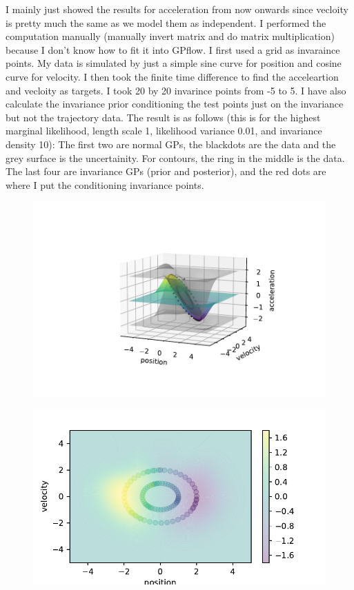 \documentclass{article}
\begin{document}
I mainly just showed the results for acceleration from now onwards since vecloity is pretty much the same as we model them as independent.
I performed the computation manually (manually invert matrix and do matrix multiplication) because I don't know how to fit it into GPflow.
I first used a grid as invaraince points.
My data is simulated by just a simple sine curve for position and cosine curve for velocity. I then took the finite time difference to find the acceleartion and vecloity as targets.
I took 20 by 20 invarince points from -5 to 5.
I have also calculate the invariance prior conditioning the test points just on the invariance but not the trajectory data.
The result is as follows (this is for the highest marginal likelihood, length scale 1, likelihood variance 0.01, and invariance density 10):
The first two are normal GPs, the blackdots are the data and the grey surface is the uncertainity. 
For contours, the ring in the middle is the data. 
The last four are invariance GPs (prior and posterior), and the red dots are where I put the conditioning invariance points.
\begin{figure}[H]
  \includegraphics[width=1.2\linewidth]{regular_3D.pdf}
  \centering
\end{figure}
\begin{figure}[H]
  \includegraphics[width=\linewidth]{regular_contour.pdf}
  \centering
\end{figure}
\end{document}
